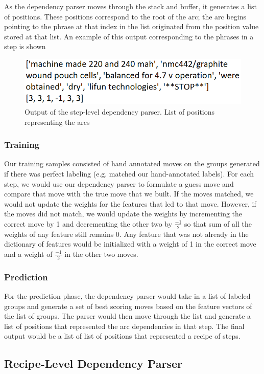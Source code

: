 As the dependency parser moves through the stack and buffer, it generates a list of positions. These positions correspond to the root of the arc; the arc begins pointing to the phrase at that index in the list originated from the position value stored at that list. An example of this output corresponding to the phrases in a step is shown

\begin{figure}
  \centering
    \includegraphics[width=.5\textwidth]{dep1out.png}
  \caption{Output of the step-level dependency parser. List of positions representing the arcs}
\end{figure}

\subsubsection{Training}
Our training samples consisted of hand annotated moves on the groups generated if there was perfect labeling (e.g. matched our hand-annotated labels). For each step, we would use our dependency parser to formulate a guess move and compare that move with the true move that we built. If the moves matched, we would not update the weights for the features that led to that move. However, if the moves did not match, we would update the weights by incrementing the correct move by 1 and decrementing the other two by $\frac{-1}{2}$ so that sum of all the weights of any feature still remains 0. Any feature that was not already in the dictionary of features would be initialized with a weight of 1 in the correct move and a weight of $\frac{-1}{2}$ in the other two moves. 

\subsubsection{Prediction}
For the prediction phase, the dependency parser would take in a list of labeled groups and generate a set of best scoring moves based on the feature vectors of the list of groups. The parser would then move through the list and generate a list of positions that represented the arc dependencies in that step. The final output would be a list of list of positions that represented a recipe of steps. 

\subsection{Recipe-Level Dependency Parser}

